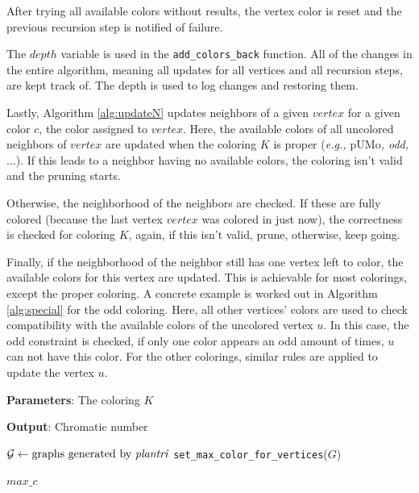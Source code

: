 \documentclass{article}
\begin{document}
After trying all available colors without results, the vertex color is reset and the previous recursion step is notified of failure.

The $depth$ variable is used in the \texttt{add\_colors\_back} function. All of the changes in the entire algorithm, meaning all updates for all vertices and all recursion steps, are kept track of. The depth is used to log changes and restoring them.

Lastly, Algorithm \ref{alg:updateN} updates neighbors of a given $vertex$ for a given color $c$, the color assigned to $vertex$. Here, the available colors of all uncolored neighbors of $vertex$ are updated when the coloring $K$ is proper (\textit{e.g., $\mathrm{pUMo}$, odd, $\dots$}). If this leads to a neighbor having no available colors, the coloring isn't valid and the pruning starts.

Otherwise, the neighborhood of the neighbors are checked. If these are fully colored (because the last vertex $vertex$ was colored in just now), the correctness is checked for coloring $K$, again, if this isn't valid, prune, otherwise, keep going. 

Finally, if the neighborhood of the neighbor still has one vertex left to color, the available colors for this vertex are updated. This is achievable for most colorings, except the proper coloring. A concrete example is worked out in Algorithm \ref{alg:special} for the odd coloring. Here, all other vertices' colors are used to check compatibility with the available colors of the uncolored vertex $u$. In this case, the odd constraint is checked, if only one color appears an odd amount of times, $u$ can not have this color.
For the other colorings, similar rules are applied to update the vertex $u$.

\begin{algorithm}[tb]
	\caption{\texttt{search\_chromatic\_number}}
	\label{alg:search}
	\textbf{Parameters}: The coloring $K$
	
	\textbf{Output}: Chromatic number
	\begin{algorithmic}[1]
		\STATE $\mathcal{G} \gets \text{graphs generated by \textit{plantri}}$
		\STATE \texttt{set\_max\_color\_for\_vertices}($G$)
		
		\RETURN $max\_c$
		\ENDIF
		\ENDFOR
		\ENDFOR
	\end{algorithmic}
\end{algorithm}
\end{document}
